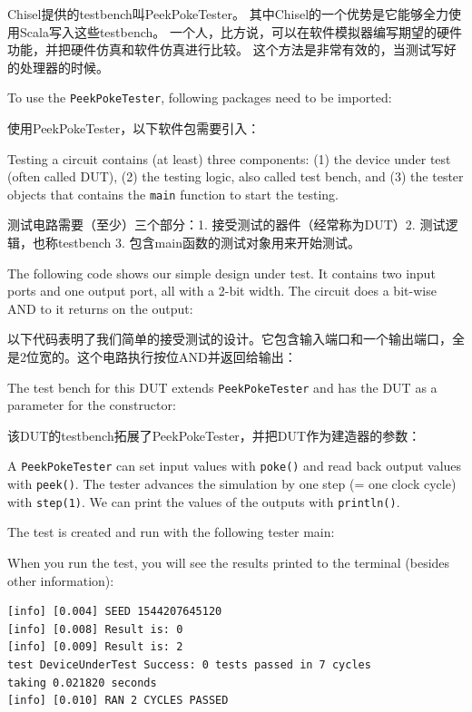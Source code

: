 \documentclass[%
    10pt,
    headinclude, footexclude,
    openright, %
    notitlepage,
    cleardoubleempty,
    headsepline,
    pointlessnumbers,
    bibtotoc, idxtotoc,
    ]{scrbook}
\newcommand{\code}[1]{{\small{\texttt{#1}}}}
\begin{document}
Chisel提供的testbench叫PeekPokeTester。
其中Chisel的一个优势是它能够全力使用Scala写入这些testbench。
一个人，比方说，可以在软件模拟器编写期望的硬件功能，并把硬件仿真和软件仿真进行比较。
这个方法是非常有效的，当测试写好的处理器的时候。

To use the \code{PeekPokeTester}, following packages need to be imported:

使用PeekPokeTester，以下软件包需要引入：


\noindent Testing a circuit contains (at least) three components: (1) the device under test (often
called DUT), (2) the testing logic, also called test bench, and (3) the tester objects
that contains the \code{main} function to start the testing.

测试电路需要（至少）三个部分：1. 接受测试的器件（经常称为DUT）2. 测试逻辑，也称testbench 3. 包含main函数的测试对象用来开始测试。

The following code shows our simple design under test. It contains two input
ports and one output port, all with a 2-bit width. The circuit does a bit-wise AND
to it returns on the output:

以下代码表明了我们简单的接受测试的设计。它包含输入端口和一个输出端口，全是2位宽的。这个电路执行按位AND并返回给输出：


\noindent The test bench for this DUT extends \code{PeekPokeTester} and has
the DUT as a parameter for the constructor:

该DUT的testbench拓展了PeekPokeTester，并把DUT作为建造器的参数：


\noindent A \code{PeekPokeTester} can set input values with \code{poke()} and
read back output values with \code{peek()}. The tester advances the simulation by one
step (= one clock cycle) with \code{step(1)}.
We can print the values of the outputs with \code{println()}.

The test is created and run with the following tester main:


\noindent When you run the test, you will see the results printed to the terminal
(besides other information):

\begin{verbatim}
[info] [0.004] SEED 1544207645120
[info] [0.008] Result is: 0
[info] [0.009] Result is: 2
test DeviceUnderTest Success: 0 tests passed in 7 cycles
taking 0.021820 seconds
[info] [0.010] RAN 2 CYCLES PASSED
\end{verbatim}
\end{document}
